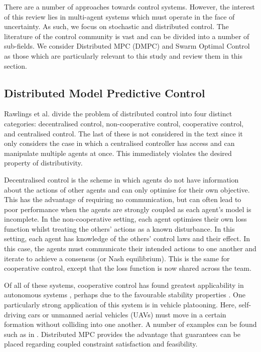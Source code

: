 \documentclass[.../main.tex]{subfiles}
\begin{document}
There are a number of approaches towards control systems. However, the interest of this review lies
in multi-agent systems which must operate in the face of uncertainty. As such, we focus on
stochastic and distributed control. The literature of the control community is vast and can be
divided into a number of sub-fields. We consider Distributed MPC (DMPC) and Swarm Optimal Control as
those which are particularly relevant to this study and review them in this section.

\subsection{Distributed Model Predictive Control} \label{sec::Distributed_MPC}

Rawlings et al. \cite{rawlings2017model} divide the problem of distributed control into four distinct
categories: decentralised control, non-cooperative control, cooperative control, and centralised
control. The last of these is not considered in the text since it only considers the case in which a
centralised controller has access and can manipulate multiple agents at once. This immediately
violates the desired property of distributivity.

Decentralised control is the scheme in which agents do not have information about the actions of
other agents and can only optimise for their own objective. This has the advantage of requiring no
communication, but can often lead to poor performance when the agents are strongly coupled as each
agent’s model is incomplete. In the non-cooperative setting, each agent optimises their own loss
function whilst treating the others’ actions as a known disturbance. In this setting, each agent has
knowledge of the others’ control laws and their effect. In this case, the agents must communicate
their intended actions to one another and iterate to achieve a consensus (or Nash equilibrium). This
is the same for cooperative control, except that the loss function is now shared across the team. 

Of all of these systems, cooperative control has found greatest applicability in autonomous systems
\cite{Negenborn2014}, perhaps due to the favourable stability properties \cite{Venkat2006}. One
particularly strong application of this system is in vehicle platooning. Here, self-driving cars or
unmanned aerial vehicles (UAVs) must move in a certain formation without colliding into one another.
A number of examples can be found such as in \cite{Liu2019, VanParys2017, Zheng2017}. Distributed
MPC provides the advantage that guarantees can be placed regarding coupled constraint satisfaction
and feasibility.
\end{document}
